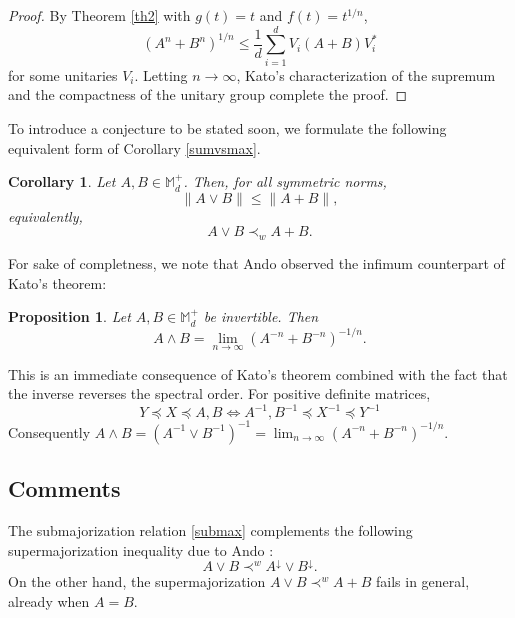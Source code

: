 \documentclass[12pt,reqno]{article}
\newtheorem{cor}[theorem]{Corollary}
\newtheorem{prop}[theorem]{Proposition}
\theoremstyle{definition}
\theoremstyle{remark}
\numberwithin{equation}{section}
\def\bM{\mathbb{M}}
\begin{document}
\vskip 5pt
\begin{proof} By Theorem \ref{th2} with $g(t)=t$ and $f(t)=t^{1/n}$,
$$
(A^{n} + B^{n})^{1/n} \le \frac{ 1}{d}  \sum_{i=1}^d V_i (A+ B)V_i^*
$$
for some unitaries $V_i$. 
 Letting $n\to \infty$,  Kato's characterization of the  supremum and the compactness of the unitary group complete the proof.
\end{proof}

\vskip 5pt To introduce a  conjecture to be stated soon,  we formulate the following equivalent form of  Corollary \ref{sumvsmax}.

\vskip 5pt
\begin{cor} Let $A,B\in\bM_d^+$. Then, for all symmetric norms,
\begin{equation}\label{normmax}
 \| A\vee B\|\le \| A+ B\|,
\end{equation}
equivalently,
\begin{equation}\label{submax} 
 A\vee B \prec_{w} A+ B.
\end{equation}
\end{cor}

\vskip 5pt
For sake of completness, we note that Ando \cite[Lemma 6.15]{Ando} observed the infimum counterpart of Kato's theorem:

\vskip 5pt
\begin{prop}  Let $A,B\in\bM_d^+$ be invertible. Then 
$$
A\wedge B =\lim_{n\to\infty} \left(A^{-n}+B^{-n}\right)^{-1/n}.
$$
\end{prop}

\vskip 5pt
This is an immediate consequence of Kato's theorem combined with the fact that the inverse reverses the spectral order. For positive definite matrices,
$$
Y\preceq X\preceq A, B \iff A^{-1}, B^{-1} \preceq X^{-1}\preceq Y^{-1}
$$
Consequently $A\wedge B= (A^{-1}\vee B^{-1})^{-1}=\lim_{n\to\infty} \left(A^{-n}+B^{-n}\right)^{-1/n}$.







\subsection{Comments}

The submajorization relation \eqref{submax} complements the following supermajorization inequality due to Ando \cite[Theorem 6.16]{Ando}:
$$A\vee B\prec^{w} A^{\downarrow} \vee B^{\downarrow}.$$
On the other hand, the supermajorization 
 $A\vee B \prec^{w} A+B$ fails in general, already when $A=B$.  
\end{document}
